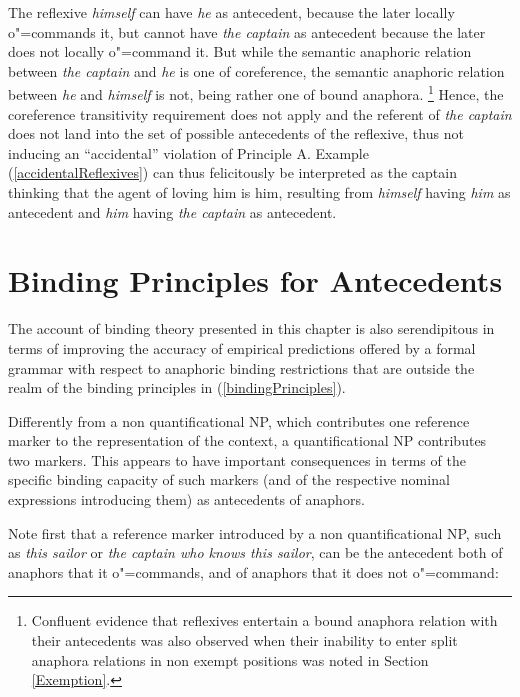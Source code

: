 \documentclass[output=paper
,modfonts
,nonflat]{langsci/langscibook}
\begin{document}
The reflexive \emph{himself} can have \emph{he} as antecedent, because the later locally
o"=commands it, but cannot have \emph{the captain} as antecedent because the later
does not locally o"=command it. But while the semantic anaphoric relation between \emph{the captain} 
and \emph{he} is one of coreference, the semantic anaphoric relation between \emph{he}
and \emph{himself} is not, being rather one of bound anaphora.%
\footnote{
Confluent evidence that reflexives entertain a bound anaphora relation with their antecedents
was also observed when their inability to enter split anaphora relations in non exempt positions
was noted in Section \ref{Exemption}.
}
Hence, 
the coreference transitivity requirement does not apply and the referent
of \emph{the captain} does not land into the set of possible antecedents
of the reflexive, thus not inducing an ``accidental'' violation of Principle A. Example  (\ref{accidentalReflexives})
can thus felicitously be interpreted as the captain thinking that the agent of loving him is him,
resulting from \emph{himself} having \emph{him} as antecedent and \emph{him} having \emph{the captain} as antecedent.



\section{Binding Principles for Antecedents \label{reverse}}

The account of binding theory presented in this chapter is also 
serendipitous in terms of improving the accuracy of empirical predictions offered 
by a formal grammar with respect to anaphoric binding restrictions that are outside the
realm of the binding principles in (\ref{bindingPrinciples}).

Differently from a non quantificational NP, which contributes
one reference marker to the representation of the context, a quantificational
NP contributes two markers. This appears to
have important consequences in terms of the specific binding 
capacity of such markers (and of the respective nominal expressions introducing them)
as antecedents of anaphors. 

Note first that a reference marker introduced by a non quantificational NP,
such as \emph{this sailor} or \emph{the captain who knows this sailor}, can be 
the antecedent both of anaphors that it o"=commands, and of anaphors that
it does not o"=command:

\begin{exe}
\ex
\begin{xlist}
\end{xlist}
\end{exe}
\end{document}
